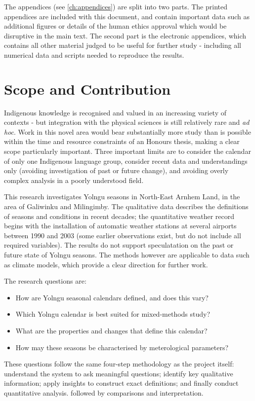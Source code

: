 The appendices (see \cref{ch:appendices}) are split into two parts.
The printed appendices are included with this document, and contain
important data such as additional figures or details of the human ethics
approval which would be disruptive in the main text.  The second part
is the electronic appendices, which contains all other material judged to
be useful for further study - including all numerical data and scripts
needed to reproduce the results.



\section{Scope and Contribution}

Indigenous knowledge is recognised and valued in an increasing variety
of contexts \citep[eg.][]{petheram2010,cochran2015,berkes2012} -
but integration with the physical sciences is still relatively rare and
\textit{ad hoc}.  Work in this novel area would bear substantially more study than
is possible within the time and resource constraints of an Honours thesis,
making a clear scope particularly important.
%
Three important limits are to consider the calendar of only one Indigenous
language group, consider recent data and understandings only (avoiding
investigation of past or future change), and avoiding overly complex
analysis in a poorly understood field.

This research investigates Yolngu seasons in North-East Arnhem Land, in
the area of Galiwinku and Milingimby.  The qualitative data describes the
definitions of seasons and conditions in recent decades; the quantitative
weather record begins with the installation of automatic weather stations
at several airports between 1990 and 2003  (some earlier observations exist,
but do not include all required variables).  The results do not support
speculatation on the past or future state of Yolngu seasons.  The methods
however are applicable to data such as climate models, which provide
a clear direction for further work.

The research questions are:
\begin{itemize}
\item How are Yolngu seasonal calendars defined, and does this vary?
\item Which Yolngu calendar is best suited for mixed-methods study?
\item What are the properties and changes that define this calendar?
\item How may these seasons be characterised by meterological parameters?
\end{itemize}
These questions follow the same four-step methodology as the project itself:
understand the system to ask meaningful questions; identify key
qualitative information; apply insights to construct exact definitions; and
finally conduct quantitative analysis. followed by comparisons and interpretation.


